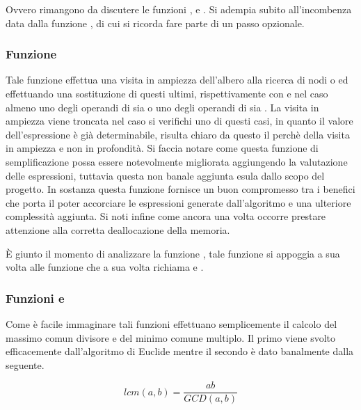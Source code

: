 \documentclass[11pt,letterpaper,twoside]{article}
\begin{document}

Ovvero rimangono da discutere le funzioni ,  e
. Si adempia subito all'incombenza data dalla funzione
, di cui si ricorda fare parte di un passo opzionale.

\subsubsection{Funzione } 

Tale funzione effettua una visita in ampiezza dell'albero alla ricerca di nodi
 o  ed effettuando una sostituzione di questi ultimi,
rispettivamente con  e  nel caso almeno uno degli
operandi di  sia  o uno degli operandi di 
sia . La visita in ampiezza viene troncata nel caso si verifichi
uno di questi casi, in quanto il valore dell'espressione è già determinabile,
risulta chiaro da questo il perchè della visita in ampiezza e non in profondità.
Si faccia notare come questa funzione di semplificazione possa essere
notevolmente migliorata aggiungendo la valutazione delle espressioni, tuttavia
questa non banale aggiunta esula dallo scopo del progetto.  In sostanza questa
funzione fornisce un buon compromesso tra i benefici che porta il poter
accorciare le espressioni generate dall'algoritmo e una ulteriore complessità
aggiunta. Si noti infine come ancora una volta occorre prestare attenzione alla
corretta deallocazione della memoria.

\`E giunto il momento di analizzare la funzione , tale
funzione si appoggia a sua volta alle funzione  che a sua volta
richiama  e .

\subsubsection{Funzioni  e } 

Come è facile immaginare tali funzioni effettuano semplicemente il calcolo del
massimo comun divisore e del minimo comune multiplo. Il primo viene svolto
efficacemente dall'algoritmo di Euclide\autocite{euclid} mentre il secondo è
dato banalmente dalla seguente.

$$lcm(a, b) = \frac{a b}{GCD(a, b)}$$
\end{document}
